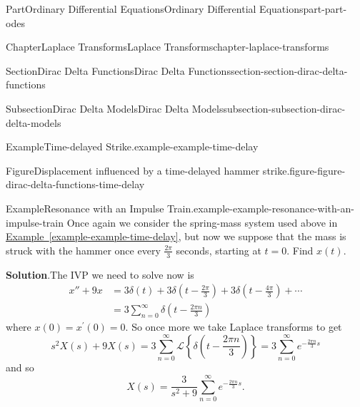 \documentclass[twoside,10pt,]{book}
\newcommand{\blocktitlefont}{\relax}
\newcommand{\xreffont}{\relax}
\numberwithin{equation}{part}
\newcommand{\Sum}[2]{\sum_{#1}^{#2}}
\newcommand{\Laplace}[1]{\mathcal{L}\set{#1}}
\newcommand{\set}[1]{\left\{ #1 \right\}}
\begin{document}
\begin{partptx}{Part}{Ordinary Differential Equations}{}{Ordinary Differential Equations}{}{}{part-part-odes}
\begin{chapterptx}{Chapter}{Laplace Transforms}{}{Laplace Transforms}{}{}{chapter-laplace-transforms}
\begin{sectionptx}{Section}{Dirac Delta Functions}{}{Dirac Delta Functions}{}{}{section-section-dirac-delta-functions}
\begin{subsectionptx}{Subsection}{Dirac Delta Models}{}{Dirac Delta Models}{}{}{subsection-subsection-dirac-delta-models}
\begin{example}{Example}{Time-delayed Strike.}{example-example-time-delay}
\begin{figureptx}{Figure}{Displacement influenced by a time-delayed hammer strike.}{figure-figure-dirac-delta-functions-time-delay}{}%
\begin{image}{0}{1}{0}{}%
%
\end{image}%
\tcblower
\end{figureptx}%
\end{example}
\begin{example}{Example}{Resonance with an Impulse Train.}{example-example-resonance-with-an-impulse-train}%
Once again we consider the spring-mass system used above in \hyperref[example-example-time-delay]{Example~{\xreffont\ref{example-example-time-delay}}}, but now we suppose that the mass is struck with the hammer once every \(\frac{2\pi}{3}\) seconds, starting at \(t=0\). Find \(x(t)\).%
\par\smallskip%
\noindent\textbf{\blocktitlefont Solution}.\hypertarget{solution-example-resonance-with-an-impulse-train-c}{}\quad{}The IVP we need to solve now is%
\begin{align*}
x''+9x &= 3\delta(t)+3\delta(t-\frac{2\pi}{3}) + 3\delta(t-\frac{4\pi}{3}) +\cdots\\
&= 3\Sum{n=0}{\infty}\delta(t-\frac{2\pi n}{3})
\end{align*}
where \(x(0) = x^{\prime}(0) = 0\). So once more we take Laplace transforms to get%
\begin{equation*}
s^{2}X(s)+9X(s) = 3\Sum{n=0}{\infty}\Laplace{\delta(t-\frac{2\pi n}{3})} = 3\Sum{n=0}{\infty}e^{-\frac{2\pi n}{3}s}
\end{equation*}
and so%
\begin{equation*}
X(s) = \frac{3}{s^{2}+9}\Sum{n=0}{\infty}e^{-\frac{2\pi n}{3}s}\text{.}
\end{equation*}

\end{example}
\end{subsectionptx}
\end{sectionptx}
\end{chapterptx}
\end{partptx}
\end{document}
